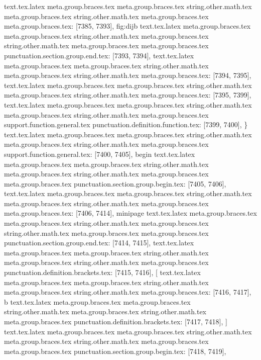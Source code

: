 {{{{{{{{{{{{{{{{{{{{{{{{{{{{{{{{{{{{{{{{{{{{{{{{{{{{{{{{{{{{{{{{{{{{{{{{{{{{{{{{{{{{{{{{{{{{{{{{{{{{{{{{{{{{{{{{{{{{{{{{{{{{{{{{{{{{{{{{{{{{{{{{{{{{{{{{{{{{{{{{{{{{{{{{{{{{{{{{{{{{{{{{{{{{{{{{{{{{{{{{{text.tex.latex meta.group.braces.tex meta.group.braces.tex string.other.math.tex meta.group.braces.tex string.other.math.tex meta.group.braces.tex meta.group.braces.tex: [7385, 7393], {fig:dijb}
text.tex.latex meta.group.braces.tex meta.group.braces.tex string.other.math.tex meta.group.braces.tex string.other.math.tex meta.group.braces.tex meta.group.braces.tex punctuation.section.group.end.tex: [7393, 7394], {}}
text.tex.latex meta.group.braces.tex meta.group.braces.tex string.other.math.tex meta.group.braces.tex string.other.math.tex meta.group.braces.tex: [7394, 7395], {
}
text.tex.latex meta.group.braces.tex meta.group.braces.tex string.other.math.tex meta.group.braces.tex string.other.math.tex meta.group.braces.tex: [7395, 7399], {    }
text.tex.latex meta.group.braces.tex meta.group.braces.tex string.other.math.tex meta.group.braces.tex string.other.math.tex meta.group.braces.tex support.function.general.tex punctuation.definition.function.tex: [7399, 7400], {\}
text.tex.latex meta.group.braces.tex meta.group.braces.tex string.other.math.tex meta.group.braces.tex string.other.math.tex meta.group.braces.tex support.function.general.tex: [7400, 7405], {begin}
text.tex.latex meta.group.braces.tex meta.group.braces.tex string.other.math.tex meta.group.braces.tex string.other.math.tex meta.group.braces.tex meta.group.braces.tex punctuation.section.group.begin.tex: [7405, 7406], {{}
text.tex.latex meta.group.braces.tex meta.group.braces.tex string.other.math.tex meta.group.braces.tex string.other.math.tex meta.group.braces.tex meta.group.braces.tex: [7406, 7414], {minipage}
text.tex.latex meta.group.braces.tex meta.group.braces.tex string.other.math.tex meta.group.braces.tex string.other.math.tex meta.group.braces.tex meta.group.braces.tex punctuation.section.group.end.tex: [7414, 7415], {}}
text.tex.latex meta.group.braces.tex meta.group.braces.tex string.other.math.tex meta.group.braces.tex string.other.math.tex meta.group.braces.tex punctuation.definition.brackets.tex: [7415, 7416], {[}
text.tex.latex meta.group.braces.tex meta.group.braces.tex string.other.math.tex meta.group.braces.tex string.other.math.tex meta.group.braces.tex: [7416, 7417], {b}
text.tex.latex meta.group.braces.tex meta.group.braces.tex string.other.math.tex meta.group.braces.tex string.other.math.tex meta.group.braces.tex punctuation.definition.brackets.tex: [7417, 7418], {]}
text.tex.latex meta.group.braces.tex meta.group.braces.tex string.other.math.tex meta.group.braces.tex string.other.math.tex meta.group.braces.tex meta.group.braces.tex punctuation.section.group.begin.tex: [7418, 7419], {{}
}}}}}}}}}}}}}}}}}}}}}}}}}}}}}}}}}}}}}}}}}}}}}}}}}}}}}}}}}}}}}}}}}}}}}}}}}}}}}}}}}}}}}}}}}}}}}}}}}}}}}}}}}}}}}}}}}}}}}}}}}}}}}}}}}}}}}}}}}}}}}}}}}}}}}}}}}}}}}}}}}}}}}}}}}}}}}}}}}}}}}}}}}}}}}}}}}}}}}}}}}}
